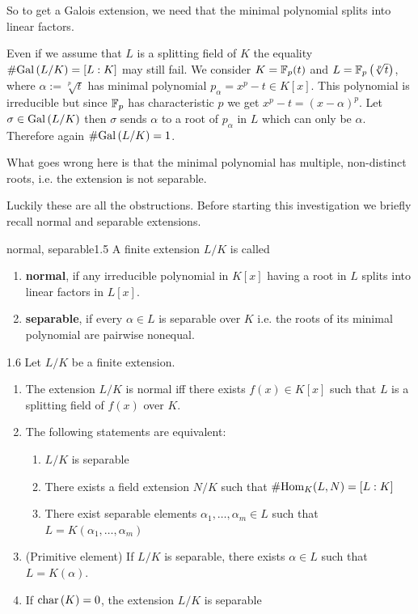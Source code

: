 \documentclass[twoside = false,	%
		headsepline,		%
		parskip = true,
		]{scrbook}						%
\begin{document}
        So to get a Galois extension, we need that the minimal polynomial splits into linear factors.
        
        Even if we assume that $L$ is a splitting field of $K$ the equality $\#\mathrm{Gal}\left( L/K\right) = [L:K]$ may still fail. We consider $K = \mathbb F_p(t)$ and $L= \mathbb F_p\left( \sqrt[p]{t}\right)$, where $\alpha:=\sqrt[p]{t}$ has minimal polynomial $p_\alpha = x^p - t \in K[x]$. This polynomial is irreducible but since $\mathbb F_p$ has characteristic $p$ we get $x^p-t = (x-\alpha)^p$. Let $\sigma \in \mathrm{Gal}\left( L/K\right)$ then $\sigma$ sends $\alpha$ to a root of $p_\alpha$ in $L$ which can only be $\alpha$. Therefore again $\#\mathrm{Gal}\left( L/K\right) = 1$.
        
        What goes wrong here is that the minimal polynomial has multiple, non-distinct roots, i.e. the extension is not separable.
        
        Luckily these are all the obstructions. Before starting this investigation we briefly recall normal and separable extensions.
        
        \begin{definition}{normal, separable}{1.5}
            A finite extension $L/K$ is called
            \begin{enumerate}
                \item \textbf{normal}, if any irreducible polynomial in $K[x]$ having a root in $L$ splits into linear factors in $L[x]$.
                \item \textbf{separable}, if every $\alpha \in L$ is separable over $K$ i.e. the roots of its minimal polynomial are pairwise nonequal.
            \end{enumerate}
        \end{definition}

        \begin{proposition}{}{1.6}
            Let $L/K$ be a finite extension.
            \begin{enumerate}
                \item The extension $L/K$ is normal iff there exists $f(x) \in K[x]$ such that $L$ is a splitting field of $f(x)$ over $K$.
                \item The following statements are equivalent:
                    \begin{enumerate}
                        \item $L/K$ is separable
                        \item There exists a field extension $N/K$ such that $\#\mathrm{Hom}_K(L,N) = [L:K]$
                        \item There exist separable elements $\alpha_1,\dots,\alpha_m \in L$ such that $L = K(\alpha_1,\dots,\alpha_m)$
                    \end{enumerate}
                \item (Primitive element) If $L/K$ is separable, there exists $\alpha \in L$ such that $L = K (\alpha)$.
                \item If $\mathrm{char} \,(K)=0$, the extension $L/K$ is separable
            \end{enumerate}
        \end{proposition}
        
\end{document}
